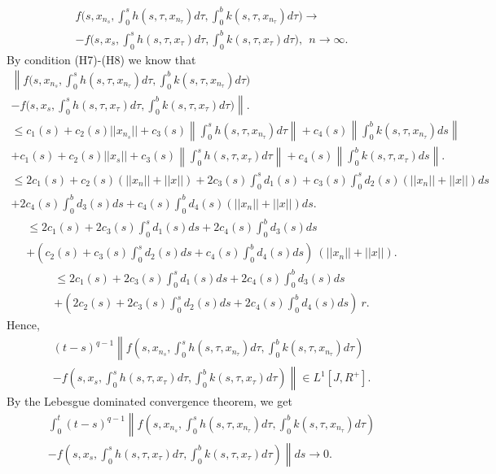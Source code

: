 \documentclass[11pt]{article}
\begin{document}
\begin{eqnarray}
f\Big(s,x_{n_s},\int^s_0h(s,\tau,x_{n_\tau})d\tau,\int^b_0k(s,\tau,x_{n_\tau})d\tau\Big) \rightarrow \nonumber \\   -f\Big(s,x_s,\int^s_0h(s,\tau,x_\tau)d\tau,\int^b_0k(s,\tau,x_\tau)d\tau\Big), \ \ n\rightarrow \infty.
\end{eqnarray}
By condition (H7)-(H8) we know that
\begin{eqnarray*}
\left\|f\Big(s,x_{n_s},\int^s_0h(s,\tau,x_{n_\tau})d\tau,\int^b_0k(s,\tau,x_{n_\tau})d\tau\Big) \right. \\ \left.  -f\Big(s,x_s,\int^s_0h(s,\tau,x_\tau)d\tau,\int^b_0k(s,\tau,x_\tau)d\tau\Big)\right\|.\\
 \leq  c_1(s)+c_2(s)||x_{n_s}||+c_3(s)\left\|\int^s_0h(s,\tau,x_{n_\tau})d\tau\right\|+c_4(s)\left\|\int^b_0k(s,\tau,x_{n_\tau})ds\right\|\\
+c_1(s)+c_2(s)||x_s||+c_3(s)\left\|\int^s_0h(s,\tau,x_\tau)d\tau\right\|+c_4(s)\left\|\int^b_0k(s,\tau,x_\tau)ds\right\|.
\end{eqnarray*}
\begin{eqnarray*}
\leq 2c_1(s)+c_2(s)\left(||x_n||+||x||\right)+2c_3(s)\int^s_0d_1(s)+c_3(s)\int^s_0d_2(s)\left(||x_n||+||x||\right)ds \\
+2c_4(s)\int^b_0d_3(s)ds+c_4(s)\int^b_0d_4(s)\left(||x_n||+||x||\right)ds.
\end{eqnarray*}
\begin{eqnarray*}
\leq 2c_1(s)+2c_3(s)\int^s_0d_1(s)ds+2c_4(s)\int^b_0d_3(s)ds\\
+\left(c_2(s)+c_3(s)\int^s_0d_2(s)ds+c_4(s)\int^b_0d_4(s)ds\right)  \ \left(||x_n||+||x||\right).
\end{eqnarray*}
\begin{eqnarray}
\leq 2c_1(s)+2c_3(s)\int^s_0d_1(s)ds+2c_4(s)\int^b_0d_3(s)ds \nonumber\\
+\left(2c_2(s)+2c_3(s)\int^s_0d_2(s)ds+2c_4(s)\int^b_0d_4(s)ds\right) \ r. \nonumber 
\end{eqnarray}
Hence,
\begin{eqnarray}
(t-s)^{q-1}\left\|f\left(s,x_{n_s},\int^s_0h(s,\tau,x_{n_\tau})d\tau,\int^b_0k(s,\tau,x_{n_\tau})d\tau\right) \right. \nonumber \\ \left.
-f\left(s,x_s,\int^s_0h(s,\tau,x_\tau)d\tau,\int^b_0k(s,\tau,x_\tau)d\tau\right)\right\|\in L^1[J,R^+].
\end{eqnarray}
By the Lebesgue dominated convergence theorem, we get
\begin{eqnarray}
\int^t_0(t-s)^{q-1}\left\|f\left(s,x_{n_s},\int^s_0h(s,\tau,x_{n_\tau})d\tau,\int^b_0k(s,\tau,x_{n_\tau})d\tau\right) \right. \nonumber \\ \left.-f\left(s,x_s,\int^s_0h(s,\tau,x_\tau)d\tau,\int^b_0k(s,\tau,x_\tau)d\tau\right)\right\|ds\rightarrow 0.
\end{eqnarray}
\end{document}
